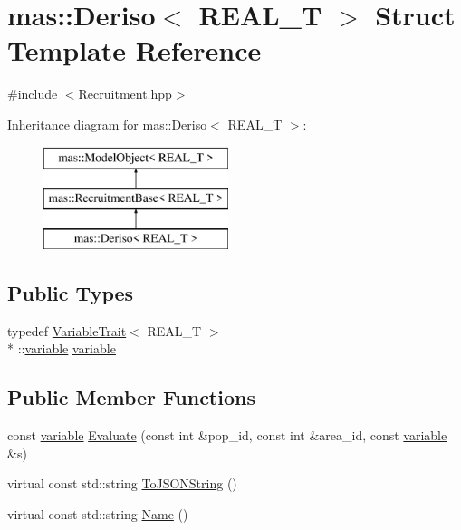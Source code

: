 \hypertarget{structmas_1_1_deriso}{\section{mas\-:\-:Deriso$<$ R\-E\-A\-L\-\_\-\-T $>$ Struct Template Reference}
\label{structmas_1_1_deriso}
}


{\ttfamily \#include $<$Recruitment.\-hpp$>$}

Inheritance diagram for mas\-:\-:Deriso$<$ R\-E\-A\-L\-\_\-\-T $>$\-:\begin{figure}[H]
\begin{center}
\leavevmode
\includegraphics[height=3.000000cm]{structmas_1_1_deriso}
\end{center}
\end{figure}
\subsection*{Public Types}
\begin{DoxyCompactItemize}
\item 
typedef \hyperlink{structmas_1_1_variable_trait}{Variable\-Trait}$<$ R\-E\-A\-L\-\_\-\-T $>$\\*
\-::\hyperlink{structmas_1_1_deriso_a458705874e9be66739422da45db21ff0}{variable} \hyperlink{structmas_1_1_deriso_a458705874e9be66739422da45db21ff0}{variable}
\end{DoxyCompactItemize}
\subsection*{Public Member Functions}
\begin{DoxyCompactItemize}
\item 
const \hyperlink{structmas_1_1_deriso_a458705874e9be66739422da45db21ff0}{variable} \hyperlink{structmas_1_1_deriso_a056c98851c0b002b87c31b8b4a660fde}{Evaluate} (const int \&pop\-\_\-id, const int \&area\-\_\-id, const \hyperlink{structmas_1_1_deriso_a458705874e9be66739422da45db21ff0}{variable} \&s)
\item 
virtual const std\-::string \hyperlink{structmas_1_1_deriso_aabf1cedad5697f1924a09d3a168453c4}{To\-J\-S\-O\-N\-String} ()
\item 
virtual const std\-::string \hyperlink{structmas_1_1_deriso_a4bd2deff5d9d3cac9e90941df9881b29}{Name} ()
\end{DoxyCompactItemize}

